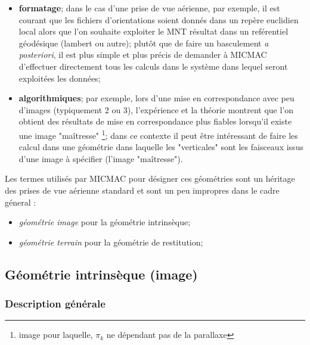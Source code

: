 \begin{itemize}
   \item  {\bf formatage}; dans le cas d'une prise de vue  a\'erienne,
          par exemple, il est courant que les fichiers d'orientations
          soient donn\'es dans un rep\`ere euclidien local alors que l'on
          souhaite exploiter le MNT r\'esultat dans un ref\'erentiel 
          g\'eod\'esique (lambert ou autre); plut\^ot que de faire un 
          basculement \emph{a posteriori}, il est plus simple et plus
          pr\'ecis de demander \`a MICMAC d'effectuer directement 
          tous les calculs dans le syst\`eme dans lequel seront 
          exploit\'ees les donn\'ees;


   \item  {\bf algorithmiques}; par exemple, lors d'une mise en correspondance
          avec peu d'images (typiquement 2 ou 3), l'exp\'erience et 
          la th\'eorie montrent que l'on obtient des r\'esultats de mise
          en correspondance plus fiables lorsqu'il existe une image
          "ma\^itresse" \footnote{image pour laquelle,
           $\pi_k$ ne d\'ependant pas de la parallaxe}; dans ce contexte il
           peut \^etre int\'eressant de faire les calcul dans une g\'eom\'etrie 
           dans laquelle les "verticales" sont les faisceaux issus d'une
           image \`a sp\'ecifier (l'image "ma\^itresse").

\end{itemize}


Les termes utilis\'es par MICMAC pour d\'esigner ces g\'eom\'etries sont
un h\'eritage des prises de vue a\'erienne standard et sont un peu
impropres dans le cadre g\'eneral :


\begin{itemize}
   \item \emph{g\'eom\'etrie image} pour la  g\'eom\'etrie intrins\`eque;
   \item \emph{g\'eom\'etrie terrain} pour la  g\'eom\'etrie de 
          restitution;
\end{itemize}


\subsection{G\'eom\'etrie intrins\`eque (image)}




\subsubsection{Description g\'en\'erale}

